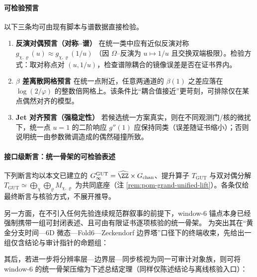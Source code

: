 \paragraph{可检验预言}
以下三条均可由现有脚本与谱数据直接检验。

\begin{enumerate}
  \item \textbf{反演对偶预言（对称--谱）} 在统一类中应有近似反演对称
  \(
  g_{\chi,\varrho}(u)\approx g_{\chi,\varrho}(1/u)
  \)
  （因 \(\Omega\)--反演为 \(u\mapsto 1/u\) 且交换双端极限）。检验方式：取对称点对 \((u,1/u)\)，检查谱隙耦合的镜像误差是否在证书界内。

  \item \textbf{\(\beta\) 差离散网格预言} 在统一点附近，任意两通道的 \(\beta(1)\) 之差应落在 \(\log(2/\varphi)\) 的整数倍网格上。该条件比“耦合值接近”更苛刻，可排除仅在某点偶然对齐的模型。

  \item \textbf{Jet 对齐预言（强稳定性）} 若候选统一方案真实，则在不同观测门/核的微扰下，统一点 \(u=1\) 的二阶响应 \(g''(1)\) 应保持同类（误差随证书缩小）；否则说明统一由参数微调造成的偶然碰撞所致。
\end{enumerate}

\paragraph{接口级断言：统一骨架的可检验表述}\label{par:gut-seven-additional-results}
下列断言均以本文已建立的 \(G_\infty^{\mathrm{GUT}}=\widehat{\ZZ}\times G_{\mathrm{chan}}\)、提升算子 \(T_{\mathrm{GUT}}\) 与双对偶分解
\(
T_{\mathrm{GUT}}\simeq\bigoplus_{\chi}\bigoplus_{\varrho}M_{\chi,\varrho}
\)
为共同底座（注 \ref{rem:pom-grand-unified-lift}）。各条仅给最终断言与核验方式，不展开推导。

另一方面，在不引入任何先验连续规范群叙事的前提下，window-\(6\) 锚点本身已经强制携带一组可封闭表述、且可由有限证书逐项核验的统一骨架。
为突出其在“黄金分支时间—6D 微态—Fold6—Zeckendorf 边界塔”口径下的终端收束，先给出一组仅含结论与审计指针的命题组：



其后，若进一步将分辨率层—边界层—同步核视为同一可审计对象族，则可将 window-\(6\) 的统一骨架压缩为下述总结定理（同样仅陈述结论与离线核验入口）：

